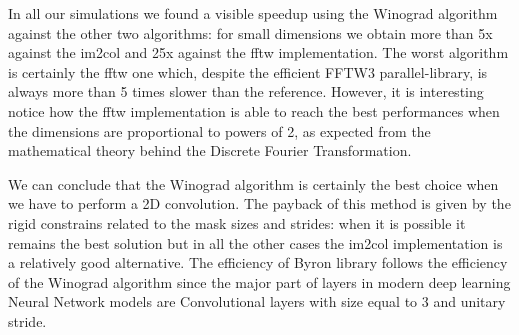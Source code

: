 \documentclass{standalone}
\begin{document}
In all our simulations we found a visible speedup using the \textsf{Winograd} algorithm against the other two algorithms: for small dimensions we obtain more than 5x against the \textsf{im2col} and 25x against the \textsf{fftw} implementation.
The worst algorithm is certainly the \textsf{fftw} one which, despite the efficient \textsf{FFTW3} parallel-library, is always more than 5 times slower than the reference.
However, it is interesting notice how the \textsf{fftw} implementation is able to reach the best performances when the dimensions are proportional to powers of 2, as expected from the mathematical theory behind the Discrete Fourier Transformation.

We can conclude that the \textsf{Winograd} algorithm is certainly the best choice when we have to perform a 2D convolution.
The payback of this method is given by the rigid constrains related to the mask sizes and strides: when it is possible it remains the best solution but in all the other cases the \textsf{im2col} implementation is a relatively good alternative.
The efficiency of \textsf{Byron} library follows the efficiency of the \textsf{Winograd} algorithm since the major part of layers in modern deep learning Neural Network models are Convolutional layers with size equal to 3 and unitary stride.

\end{document}
